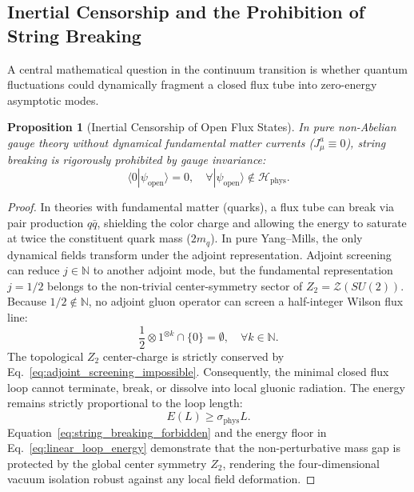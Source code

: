 \documentclass[11pt,reqno]{article}
\newtheorem{proposition}[theorem]{Proposition}
\begin{document}
\subsection{Inertial Censorship and the Prohibition of String Breaking}
A central mathematical question in the continuum transition is whether quantum fluctuations could dynamically fragment a closed flux tube into zero-energy asymptotic modes.
\begin{proposition}[Inertial Censorship of Open Flux States]
In pure non-Abelian gauge theory without dynamical fundamental matter currents ($J_\mu^a \equiv 0$), string breaking is rigorously prohibited by gauge invariance:
\begin{equation}
    \label{eq:string_breaking_forbidden}
    \langle 0 | \psi_{\mathrm{open}} \rangle = 0, \quad \forall |\psi_{\mathrm{open}}\rangle \notin \mathcal{H}_{\mathrm{phys}}.
\end{equation}
\end{proposition}
\begin{proof}
In theories with fundamental matter (quarks), a flux tube can break via pair production $q\bar{q}$, shielding the color charge and allowing the energy to saturate at twice the constituent quark mass ($2 m_q$).
In pure Yang--Mills, the only dynamical fields transform under the adjoint representation. Adjoint screening can reduce $j \in \mathbb{N}$ to another adjoint mode, but the fundamental representation $j = 1/2$ belongs to the non-trivial center-symmetry sector of $Z_2 = \mathcal{Z}(SU(2))$.
Because $1/2 \notin \mathbb{N}$, no adjoint gluon operator can screen a half-integer Wilson flux line:
\begin{equation}
    \label{eq:adjoint_screening_impossible}
    \frac{1}{2} \otimes 1^{\otimes k} \cap \{0\} = \emptyset, \quad \forall k \in \mathbb{N}.
\end{equation}
The topological $Z_2$ center-charge is strictly conserved by Eq.~\eqref{eq:adjoint_screening_impossible}.
Consequently, the minimal closed flux loop cannot terminate, break, or dissolve into local gluonic radiation.
The energy remains strictly proportional to the loop length:
\begin{equation}
    \label{eq:linear_loop_energy}
    E(L) \ge \sigma_{\mathrm{phys}} L.
\end{equation}
Equation~\eqref{eq:string_breaking_forbidden} and the energy floor in Eq.~\eqref{eq:linear_loop_energy} demonstrate that the non-perturbative mass gap is protected by the global center symmetry $Z_2$, rendering the four-dimensional vacuum isolation robust against any local field deformation.
\end{proof}
\end{document}
